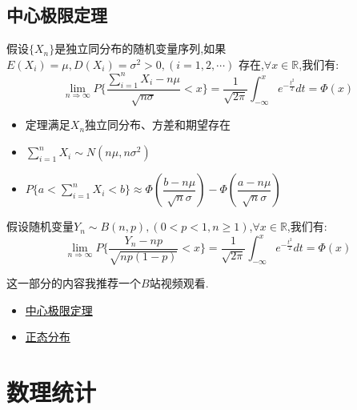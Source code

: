 \section{中心极限定理}
\begin{theorem}[列维-林德伯格定理]
	假设$\{X_{n}\}$是独立同分布的随机变量序列,如果$E(X_{i})=\mu,D(X_{i})=\sigma^2>0,(i=1,2,\cdots)$
	存在,$\forall x\in \mathbb{R}$,我们有: 
	$$\lim\limits_{n\Rightarrow \infty}P\{\dfrac{\sum\limits_{i=1}^{n}X_{i}-n\mu}{\sqrt{n\sigma}}<x\}=\dfrac{1}{\sqrt{2\pi}}\int_{-\infty}^{x}e^{-\frac{t^2}{2}}dt=\varPhi(x)$$
\end{theorem}
\begin{anymark}[注]
	\begin{itemize}
		\item $\text{定理满足}X_{n}\text{独立同分布、方差和期望存在}$
		\item $\sum\limits_{i=1}^{n}X_{i}\sim N(n\mu,n\sigma^2)$
		\item $P\{a<\sum\limits_{i=1}^{n}X_{i}<b\}\approx\varPhi(\dfrac{b-n\mu}{\sqrt{n}\sigma})-\varPhi(\dfrac{a-n\mu}{\sqrt{n}\sigma})$
	\end{itemize}
\end{anymark}
\begin{theorem}
	假设随机变量$Y_{n}\sim B(n,p),(0<p<1,n\geq 1)$,$\forall x\in \mathbb{R}$,我们有: 
	$$\lim\limits_{n\Rightarrow \infty}P\{\dfrac{Y_{n}-np}{\sqrt{np(1-p)}}<x\}=\dfrac{1}{\sqrt{2\pi}}\int_{-\infty}^{x}e^{-\frac{t^2}{2}}dt=\varPhi(x)$$
\end{theorem}
这一部分的内容我推荐一个$B$站视频观看.
\begin{itemize}
	\item \href{https://www.bilibili.com/video/BV1gh4y1W7ag/?spm_id_from=333.999.list.card_archive.click}{中心极限定理}
	\item \href{https://www.bilibili.com/video/BV1wu411W7uU/?spm_id_from=333.999.list.card_archive.click}{正态分布}
\end{itemize}
\chapter{数理统计}
